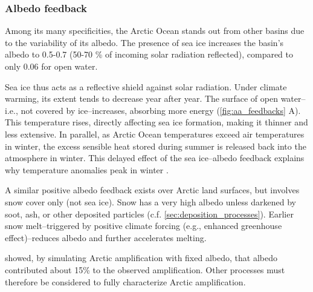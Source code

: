     \subsubsection{Albedo feedback}
    Among its many specificities, the Arctic Ocean stands out from other basins due to the variability of its albedo. The presence of sea ice increases the basin’s albedo to 0.5-0.7 (50-70 \% of incoming solar radiation reflected), compared to only 0.06 for open water.
    
    Sea ice thus acts as a reflective shield against solar radiation. Under climate warming, its extent tends to decrease year after year. The surface of open water\---i.e., not covered by ice\---increases, absorbing more energy (\cref{fig:aa_feedbacks} A). This temperature rises, directly affecting sea ice formation, making it thinner and less extensive. In parallel, as Arctic Ocean temperatures exceed air temperatures in winter, the excess sensible heat stored during summer is released back into the atmosphere in winter. This delayed effect of the sea ice–albedo feedback explains why temperature anomalies peak in winter \citep{serreze_processes_2011}.

    
    A similar positive albedo feedback exists over Arctic land surfaces, but involves snow cover only (not sea ice). Snow has a very high albedo unless darkened by soot, ash, or other deposited particles (c.f. \cref{sec:deposition_processes}). Earlier snow melt\---triggered by positive climate forcing (e.g., enhanced greenhouse effect)\---reduces albedo and further accelerates melting.
    
    \citet{graversen_polar_2009} showed, by simulating Arctic amplification with fixed albedo, that albedo contributed about 15\% to the observed amplification. Other processes must therefore be considered to fully characterize Arctic amplification.
    
